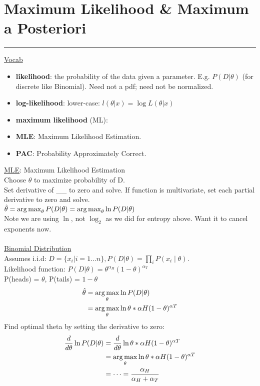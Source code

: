 \section{Maximum Likelihood \& Maximum a Posteriori}
\smallskip \hrule height 2pt \smallskip

\underline{Vocab}
\begin{itemize}
	\item\textbf{likelihood}: the probability of the data given a parameter.  E.g. $P(D | \theta)$ (for discrete like Binomial).  
	Need not a pdf; need not be normalized.   %
 	\item \textbf{log-likelihood}: lower-case: $l(\theta|x) = \log L(\theta | x)$
	\item \textbf{maximum likelihood} (ML): 
	\item \textbf{MLE}: Maximum Likelihood Estimation. 
	\item \textbf{PAC}: Probability Approximately Correct. 
\end{itemize}
 
\underline{MLE}: Maximum Likelihood Estimation \hfill \\
Choose $\theta$ to maximize probability of D. \hfill \\
Set derivative of \_\_ to zero and solve.  If function is multivariate, set each partial derivative to zero and solve. \hfill \\
$\hat{\theta} = \operatorname*{arg\,max}_\theta P(D | \theta) = \operatorname*{arg\,max}_\theta \ln P(D | \theta) $ \hfill \\
Note we are using $\ln$, not $\log_2$ as we did for entropy above.  Want it to cancel exponents now. 
 \hfill \\
 
\hfill \\
\underline{Binomial Distribution} \hfill \\
Assumes i.i.d: $D=\{x_i | i=1 \dots n\}, P(D | \theta) = \prod_i P(x_i \mid \theta)$. \hfill \\
Likelihood function: $P(D | \theta) = \theta^{\alpha_H} (1-\theta)^{\alpha_T}$  \hfill \\
P(heads) = $\theta$, P(tails) = $1 - \theta$ \hfill \\
\begin{align*} 
	\hat{\theta} &= \operatorname*{arg\,max}_\theta \ln P(D| \theta) \\
	 	 &= \operatorname*{arg\,max}_\theta \ln \theta*{\alpha H}(1-\theta)^{\alpha T}
\end{align*}
Find optimal theta by setting the derivative to zero: 
\begin{align*} 
	\frac{d}{d\theta} \ln P(D| \theta) &= \frac{d}{d\theta}  \ln \theta*{\alpha H}(1-\theta)^{\alpha T} \\
	 	 &= \operatorname*{arg\,max}_\theta \ln \theta*{\alpha H}(1-\theta)^{\alpha T} \\
		 & = \dots = \frac{\alpha_H}{\alpha_H  + \alpha_T}
\end{align*}

